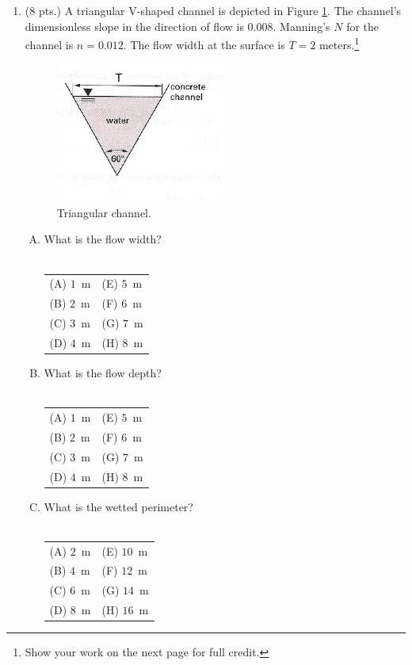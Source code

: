 \documentclass[11pt]{article}
\begin{document}
\begin{enumerate}
\clearpage
\item (8 pts.)\label{prob:VChannel}
A triangular V-shaped channel is depicted in Figure \ref{fig:TriangleChannel}.  
The channel's dimensionless slope in the direction of flow is $0.008$. 
Manning's $N$ for the channel is $n = 0.012$.  
The flow width at the surface is $T = 2$ meters.\footnote{Show your work on the next page for full credit.}
\begin{figure}[h!] %
\centering
   \includegraphics[width=2.2in]{TriangleChannel.jpg}
   \caption{Triangular channel.}
   \label{fig:TriangleChannel} 
\end{figure}
\begin{enumerate}[A)]
\item What is the flow width? \\~\\
\begin{tabular}{p{2in} p{2in}  } 
(A) $1$~m & (E) $5$~m \\ 
(B) $2$~m & (F) $6$~m  \\
(C) $3$~m & (G) $7$~m  \\
(D) $4$~m & (H) $8$~m  \\
\end{tabular}
\item What is the flow depth?\\~\\
\begin{tabular}{p{2in} p{2in}  } 
(A) $1$~m & (E) $5$~m \\ 
(B) $2$~m & (F) $6$~m  \\
(C) $3$~m & (G) $7$~m  \\
(D) $4$~m & (H) $8$~m  \\
\end{tabular}
\item What is the wetted perimeter?\\~\\
\begin{tabular}{p{2in} p{2in}  } 
(A) $2$~m & (E) $10$~m \\ 
(B) $4$~m & (F) $12$~m  \\
(C) $6$~m & (G) $14$~m  \\
(D) $8$~m & (H) $16$~m  \\
\end{tabular}


\end{enumerate}
\end{enumerate}
\end{document}
